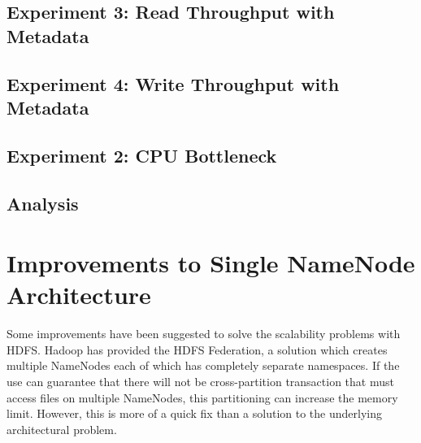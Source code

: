 \documentclass[11pt, a4paper]{article}
\begin{document}
\begin{multicols*}{2}
\subsection{Experiment 3: Read Throughput with Metadata}

\subsection{Experiment 4: Write Throughput with Metadata}

\subsection{Experiment 2: CPU Bottleneck}


\subsection{Analysis}




\section{Improvements to Single NameNode Architecture}




% 

% 

Some improvements have been suggested to solve the scalability problems with HDFS. Hadoop has provided the HDFS Federation, a solution which creates multiple NameNodes each of which has completely separate namespaces. If the use can guarantee that there will not be cross-partition transaction that must access files on multiple NameNodes, this partitioning can increase the memory limit. However, this is more of a quick fix than a solution to the underlying architectural problem. 


\end{multicols*}
\end{document}
